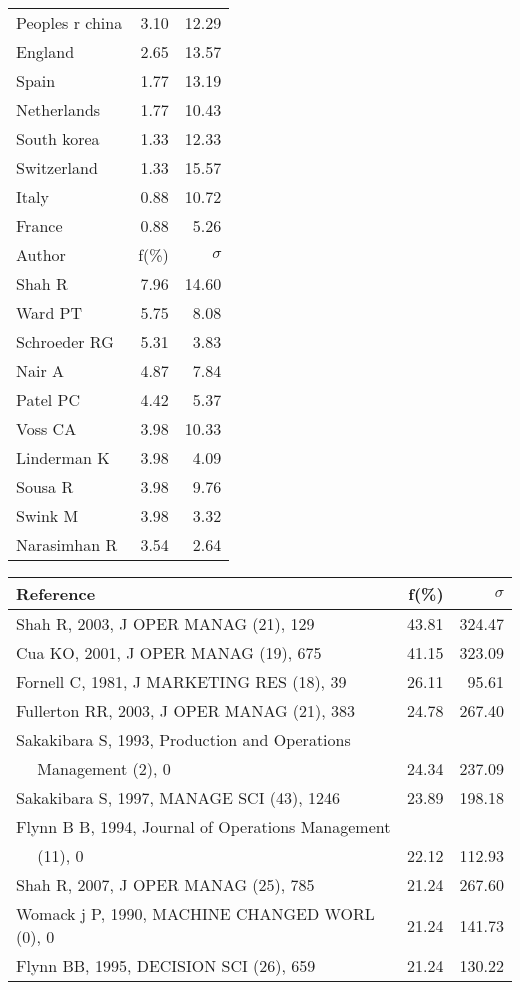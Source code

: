 \documentclass[a4paper,11pt]{report}
\begin{document}
\begin{landscape}
\begin{table}[!ht]
{\begin{tabular}{|l r r|}
Peoples r china & 3.10 & 12.29\\
England & 2.65 & 13.57\\
Spain & 1.77 & 13.19\\
Netherlands & 1.77 & 10.43\\
South korea & 1.33 & 12.33\\
Switzerland & 1.33 & 15.57\\
Italy & 0.88 & 10.72\\
France & 0.88 & 5.26\\
\hline
\hline
Author & f(\%) & $\sigma$\\
\hline
Shah R & 7.96 & 14.60\\
Ward PT & 5.75 & 8.08\\
Schroeder RG & 5.31 & 3.83\\
Nair A & 4.87 & 7.84\\
Patel PC & 4.42 & 5.37\\
Voss CA & 3.98 & 10.33\\
Linderman K & 3.98 & 4.09\\
Sousa R & 3.98 & 9.76\\
Swink M & 3.98 & 3.32\\
Narasimhan R & 3.54 & 2.64\\
\hline
\end{tabular}
}
{\scriptsize\begin{tabular}{|l r r|}
\hline
Reference & f(\%) & $\sigma$\\
\hline
Shah R, 2003, J OPER MANAG (21), 129 & 43.81 & 324.47\\
Cua KO, 2001, J OPER MANAG (19), 675 & 41.15 & 323.09\\
Fornell C, 1981, J MARKETING RES (18), 39 & 26.11 & 95.61\\
Fullerton RR, 2003, J OPER MANAG (21), 383 & 24.78 & 267.40\\
Sakakibara S, 1993, Production and Operations &  & \\
$\quad$ Management (2), 0 & 24.34 & 237.09\\
Sakakibara S, 1997, MANAGE SCI (43), 1246 & 23.89 & 198.18\\
Flynn B B, 1994, Journal of Operations Management &  & \\
$\quad$ (11), 0 & 22.12 & 112.93\\
Shah R, 2007, J OPER MANAG (25), 785 & 21.24 & 267.60\\
Womack j P, 1990, MACHINE CHANGED WORL (0), 0 & 21.24 & 141.73\\
Flynn BB, 1995, DECISION SCI (26), 659 & 21.24 & 130.22\\

\end{tabular}}
\end{table}
\end{landscape}
\end{document}
